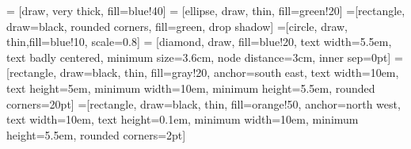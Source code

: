 \usepackage{tikz}


\usetikzlibrary{positioning,arrows,shapes,shadows}
 = [draw, very thick, fill=blue!40]
 = [ellipse, draw, thin, fill=green!20]
=[rectangle, draw=black, rounded corners, fill=green, drop shadow]
=[circle, draw, thin,fill=blue!10, scale=0.8]
 = [diamond, draw, fill=blue!20,
    text width=5.5em, text badly centered, minimum size=3.6cm, node distance=3cm, inner sep=0pt]
    =[rectangle, draw=black, thin, fill=gray!20,
                                 anchor=south east, text width=10em,
                                 text height=5em, minimum width=10em,
                                 minimum height=5.5em, rounded
                                 corners=20pt]
    =[rectangle, draw=black, thin, fill=orange!50,
                                 anchor=north west, text width=10em,
                                 text height=0.1em, minimum width=10em,
                                 minimum height=5.5em, rounded
                                 corners=2pt]




